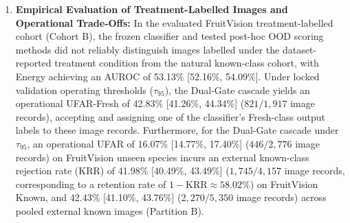 \begin{enumerate}
\item \textbf{Empirical Evaluation of Treatment-Labelled Images and Operational Trade-Offs:} In the evaluated FruitVision treatment-labelled cohort (Cohort B), the frozen classifier and tested post-hoc OOD scoring methods did not reliably distinguish images labelled under the dataset-reported treatment condition from the natural known-class cohort, with Energy achieving an AUROC of 53.13\% [52.16\%, 54.09\%]. Under locked validation operating thresholds ($\tau_{95}$), the Dual-Gate cascade yields an operational UFAR-Fresh of 42.83\% [41.26\%, 44.34\%] ($821/1,917$ image records), accepting and assigning one of the classifier's Fresh-class output labels to these image records. Furthermore, for the Dual-Gate cascade under $\tau_{95}$, an operational UFAR of 16.07\% [14.77\%, 17.40\%] ($446/2,776$ image records) on FruitVision unseen species incurs an external known-class rejection rate (KRR) of 41.98\% [40.49\%, 43.49\%] ($1,745/4,157$ image records, corresponding to a retention rate of $1 - \text{KRR} \approx 58.02\%$) on FruitVision Known, and 42.43\% [41.10\%, 43.76\%] ($2,270/5,350$ image records) across pooled external known images (Partition B).
\end{enumerate}

